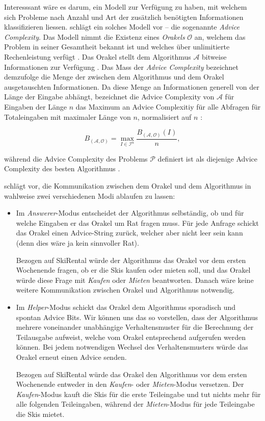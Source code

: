 \documentclass[11pt,abstracton]{scrreprt} %
\theoremstyle{definition}
\begin{document}
\bigskip
Interesssant wäre es darum, ein Modell zur Verfügung zu haben, mit welchem sich Probleme nach Anzahl und Art der zusätzlich benötigten Informationen klassifizieren liessen. \cite{Dobrev} schlägt ein solches Modell vor \cite{BKK} -- die sogenannte {\sl Advice Complexity}. Das Modell nimmt die Existenz eines {\sl Orakels} $\mathcal{O}$ an, welchem das Problem in seiner Gesamtheit bekannt ist und welches über unlimitierte Rechenleistung verfügt \cite{Dobrev, BKK}. Das Orakel stellt dem Algorithmus $\mathcal{A}$ bitweise Informationen zur Verfügung \cite{Dobrev}. Das Mass der {\sl Advice Complexity} bezeichnet demzufolge die Menge der zwischen dem Algorithmus und dem Orakel ausgetauschten Informationen. Da diese Menge an Informationen generell von der Länge der Eingabe abhängt, bezeichnet die Advice Complexity von $\mathcal{A}$ für Eingaben der Länge $n$ das Maximum an Advice Complexitiy für alle Abfragen für Totaleingaben mit maximaler Länge von $n$, normalisiert auf $n$ \cite{BKK}:

\[
	B_{(\mathcal{A}, \mathcal{O})} = \max_{I \in \mathcal{I}^n} \frac { B_{(\mathcal{A}, \mathcal{O})}(I) }{n},
\]

während die Advice Complexity des Problems $\mathcal{P}$ definiert ist als diejenige Advice Complexity des besten Algorithmus \cite{bipartite}.

\bigskip

\cite{Dobrev} schlägt vor, die Kommunikation zwischen dem Orakel und dem Algorithmus in wahlweise zwei verschiedenen Modi ablaufen zu lassen:

\begin{itemize}
\item Im {\sl Answerer}-Modus entscheidet der Algorithmus selbständig, ob und für welche Eingaben er das Orakel um Rat fragen muss. Für jede Anfrage schickt das Orakel einen Advice-String zurück, welcher aber nicht leer sein kann \cite{Dobrev} (denn dies wäre ja kein sinnvoller Rat).

Bezogen auf {\sc SkiRental} würde der Algorithmus das Orakel vor dem ersten Wochenende fragen, ob er die Skis kaufen oder mieten soll, und das Orakel würde diese Frage mit {\sl Kaufen} oder {\sl Mieten} beantworten. Danach wäre keine weitere Kommunikation zwischen Orakel und Algorithmus notwendig.

\item Im {\sl Helper}-Modus schickt das Orakel dem Algorithmus sporadisch und spontan Advice Bits. Wir können uns das so vorstellen, dass der Algorithmus mehrere voneinander unabhängige Verhaltensmuster für die Berechnung der Teilausgabe aufweist, welche vom Orakel entsprechend aufgerufen werden können. Bei jedem notwendigen Wechsel des Verhaltensmusters würde das Orakel erneut einen Advice senden.

Bezogen auf {\sc SkiRental} würde das Orakel den Algorithmus vor dem ersten Wochenende entweder in den {\sl Kaufen}- oder {\sl Mieten}-Modus versetzen. Der {\sl Kaufen}-Modus kauft die Skis für die erste Teileingabe und tut nichts mehr für alle folgenden Teileingaben, während der {\sl Mieten}-Modus für jede Teileingabe die Skis mietet.
\end{itemize}
\end{document}
